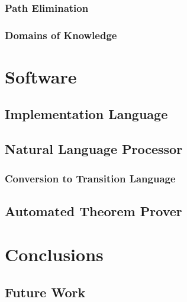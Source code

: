 \documentclass[12pt]{article}
\begin{document}
\subsubsection{Path Elimination}
\subsubsection{Domains of Knowledge}

\section{Software}
\subsection{Implementation Language}
\subsection{Natural Language Processor}
\subsubsection{Conversion to Transition Language}
\subsection{Automated Theorem Prover}

\section{Conclusions}
\subsection{Future Work}
\end{document}
